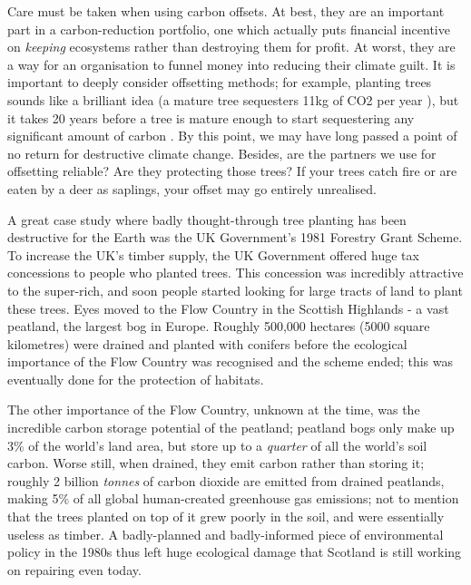 \documentclass{article}
\begin{document}
Care must be taken when using carbon offsets. At best, they are an important part in a carbon-reduction portfolio, one which actually puts financial incentive on \emph{keeping} ecosystems rather than destroying them for profit. At worst, they are a way for an organisation to funnel money into reducing their climate guilt. It is important to deeply consider offsetting methods; for example, planting trees sounds like a brilliant idea (a mature tree sequesters 11kg of CO2 per year \citep{akbari2002shade}), but it takes 20 years before a tree is mature enough to start sequestering any significant amount of carbon \citep{ghussain2020biggest}. By this point, we may have long passed a point of no return for destructive climate change. Besides, are the partners we use for offsetting reliable? Are they protecting those trees? If your trees catch fire or are eaten by a deer as saplings, your offset may go entirely unrealised. \newline

A great case study where badly thought-through tree planting has been destructive for the Earth was the UK Government's 1981 Forestry Grant Scheme. To increase the UK's timber supply, the UK Government offered huge tax concessions to people who planted trees. \citep{watkins1983public} This concession was incredibly attractive to the super-rich, and soon people started looking for large tracts of land to plant these trees. Eyes moved to the Flow Country in the Scottish Highlands - a vast peatland, the largest bog in Europe. Roughly 500,000 hectares (5000 square kilometres) were drained and planted with conifers before the ecological importance of the Flow Country was recognised and the scheme ended; this was eventually done for the protection of habitats. 

The other importance of the Flow Country, unknown at the time, was the incredible carbon storage potential of the peatland; peatland bogs only make up 3\% of the world's land area, but store up to a \emph{quarter} of all the world's soil carbon. \citep{turetsky2015global} Worse still, when drained, they emit carbon rather than storing it; roughly 2 billion \emph{tonnes} of carbon dioxide are emitted from drained peatlands, making 5\% of all global human-created greenhouse gas emissions; not to mention that the trees planted on top of it grew poorly in the soil, and were essentially useless as timber. A badly-planned and badly-informed piece of environmental policy in the 1980s thus left huge ecological damage that Scotland is still working on repairing even today. \citep{gewin2020peat} \newline
\end{document}
